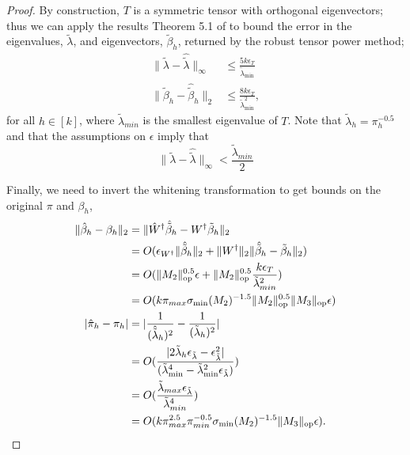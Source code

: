 \documentclass[tablecaption=bottom]{jmlr}
\newcommand\sigmamin{\sigma_\textrm{min}}
\newcommand{\Lop}{\textrm{op}}
\begin{document}
\begin{proof}
By construction, $T$ is a symmetric tensor with orthogonal eigenvectors;
thus we can apply the results Theorem 5.1 of \citet{AnandkumarGeHsu2012}
to bound the error in the eigenvalues, $\tilde \lambda$, and eigenvectors, $\tilde \beta_h$, returned by the
robust tensor power method; 
\begin{align}
\|\tilde \lambda - \hat {\tilde \lambda} \|_{\infty} 
  &\le \frac{5 k \epsilon_T}{\tilde \lambda_{\min}} \\
\|\tilde \beta_h - \hat {\tilde \beta}_h \|_2 
  &\le \frac{8 k \epsilon_T}{\tilde \lambda_{\min}^2},
\end{align}
for all $h \in [k]$, where $\tilde \lambda_{min}$ is the smallest
eigenvalue of $T$. Note that $\tilde \lambda_h = \pi_h^{-0.5}$ and that
the assumptions on $\epsilon$ imply that $$\|\tilde \lambda - \hat
{\tilde \lambda} \|_{\infty} < \frac{\tilde \lambda_{min}}{2}$$

Finally, we need to invert the whitening transformation to get bounds on
the original $\pi$ and $\beta_h$,
\begin{align*}
  \|\hat \beta_h - \beta_h\|_2
  &= \| \pinv{\hat W} \hat {\tilde \beta}_h - \pinv{W} {\tilde \beta}_h \|_2 \\
  &= O( \epsilon_{\pinv{W}} \|\hat{\tilde \beta}_h\|_2 + \|\pinv{W}\|_2 \|\hat {\tilde \beta}_h - {\tilde \beta}_h\|_2 )\\
  &= O(\|M_2\|_\Lop^{0.5} \epsilon + \|M_2\|_\Lop^{0.5} \frac{k \epsilon_{T}}{\tilde \lambda_{min}^2}) \\
  &= O( k \pi_{max} \sigmamin(M_2)^{-1.5} \|M_2\|_\Lop^{0.5} \|M_3\|_\Lop \epsilon ) \\
  |\hat \pi_h - \pi_h |
  &= |\frac{1}{(\hat{\tilde{\lambda}}_h)^2} - \frac{1}{({\tilde{\lambda}}_h)^2}| \\
  &= O( \frac{|2 {\tilde \lambda}_h \epsilon_{\tilde{\lambda}} - \epsilon_{\tilde{\lambda}}^2 |}{({\tilde \lambda}_{\min}^4 - {\tilde \lambda}_{\min}^2 \epsilon_{\tilde \lambda})} ) \\
  &= O( \frac{{\tilde \lambda}_{max} \epsilon_{\tilde \lambda}}{{\tilde\lambda}_{min}^4} ) \\
  &= O( k \pi_{max}^{2.5} \pi_{min}^{-0.5} \sigmamin(M_2)^{-1.5} \|M_3\|_\Lop \epsilon ).
\end{align*}

\end{proof}
\end{document}
